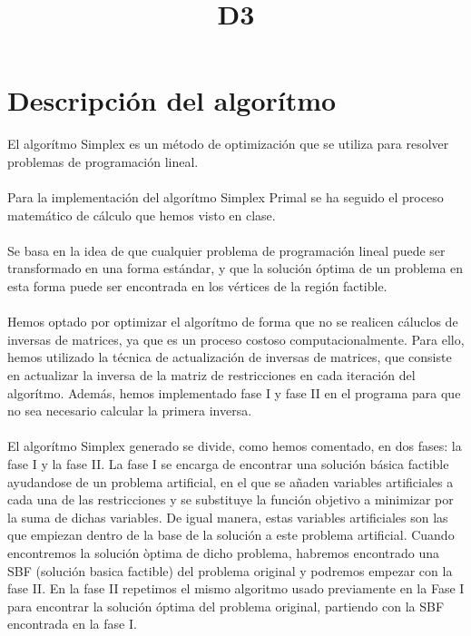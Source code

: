 \documentclass{aux}
\title{D3} %
\begin{document}




        
\fairemarges %
\fairepagedegarde
\tabledematieres

\section{Descripción del algorítmo}

El algorítmo Simplex es un método de optimización que se utiliza para resolver problemas de programación lineal. 
\\
\\
Para la implementación del algorítmo Simplex Primal se ha seguido el proceso matemático de cálculo que hemos visto en clase. 
\\
\\
Se basa en la idea de que cualquier problema de programación lineal puede ser transformado en una forma estándar, y que la solución óptima de un problema en esta forma puede ser encontrada en los vértices de la región factible.
\\
\\
Hemos optado por optimizar el algorítmo de forma que no se realicen cáluclos de inversas de matrices, ya que es un proceso costoso computacionalmente. Para ello, hemos utilizado la técnica de actualización de inversas de matrices, que consiste en actualizar la inversa de la matriz de restricciones en cada iteración del algorítmo. Además, hemos implementado fase I y fase II en el programa para que no sea necesario calcular la primera inversa.
\\
\\
El algorítmo Simplex generado se divide, como hemos comentado, en dos fases: la fase I y la fase II. La fase I se encarga de encontrar una solución básica factible ayudandose de un problema artificial, en el que se añaden variables artificiales a cada una de las restricciones y se substituye la función objetivo a minimizar por la suma de dichas variables. De igual manera, estas variables artificiales son las que empiezan dentro de la base de la solución a este problema artificial. Cuando encontremos la solución òptima de dicho problema, habremos encontrado una SBF (solución basica factible) del problema original y podremos empezar con la fase II.
En la fase II repetimos el mismo algoritmo usado previamente en la Fase I para encontrar la solución óptima del problema original, partiendo con la SBF encontrada en la fase I.
\end{document}
